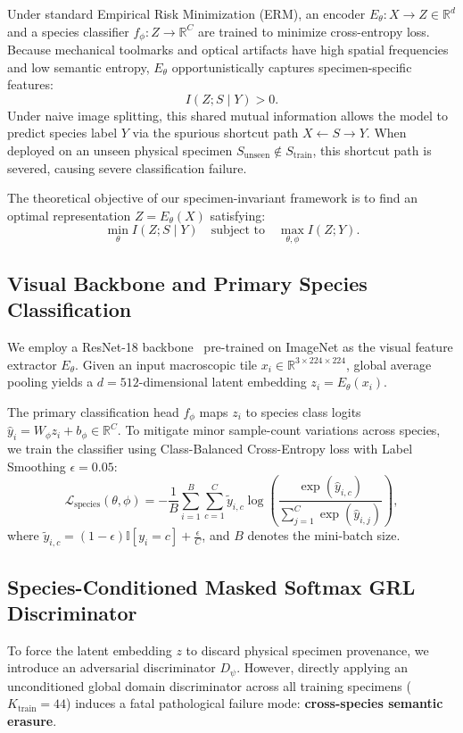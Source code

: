 \documentclass[a4paper,fleqn]{cas-sc}
\begin{document}
Under standard Empirical Risk Minimization (ERM), an encoder $E_\theta: X \to Z \in \mathbb{R}^d$ and a species classifier $f_\phi: Z \to \mathbb{R}^C$ are trained to minimize cross-entropy loss. Because mechanical toolmarks and optical artifacts have high spatial frequencies and low semantic entropy, $E_\theta$ opportunistically captures specimen-specific features:
\begin{equation}
    I(Z; S \mid Y) > 0.
\end{equation}
Under naive image splitting, this shared mutual information allows the model to predict species label $Y$ via the spurious shortcut path $X \leftarrow S \to Y$. When deployed on an unseen physical specimen $S_{\text{unseen}} \notin S_{\text{train}}$, this shortcut path is severed, causing severe classification failure. 

The theoretical objective of our specimen-invariant framework is to find an optimal representation $Z = E_\theta(X)$ satisfying:
\begin{equation}
    \min_\theta I(Z; S \mid Y) \quad \text{subject to} \quad \max_{\theta, \phi} I(Z; Y).
    \label{eq:objective}
\end{equation}

\subsection{Visual Backbone and Primary Species Classification}
We employ a ResNet-18 backbone~\cite{resnet} pre-trained on ImageNet as the visual feature extractor $E_\theta$. Given an input macroscopic tile $x_i \in \mathbb{R}^{3 \times 224 \times 224}$, global average pooling yields a $d=512$-dimensional latent embedding $z_i = E_\theta(x_i)$.

The primary classification head $f_\phi$ maps $z_i$ to species class logits $\hat{y}_i = W_\phi z_i + b_\phi \in \mathbb{R}^C$. To mitigate minor sample-count variations across species, we train the classifier using Class-Balanced Cross-Entropy loss with Label Smoothing $\epsilon = 0.05$:
\begin{equation}
    \mathcal{L}_{\text{species}}(\theta, \phi) = -\frac{1}{B} \sum_{i=1}^B \sum_{c=1}^C \tilde{y}_{i, c} \log \left(\frac{\exp(\hat{y}_{i, c})}{\sum_{j=1}^C \exp(\hat{y}_{i, j})}\right),
\end{equation}
where $\tilde{y}_{i, c} = (1 - \epsilon) \mathbb{I}[y_i = c] + \frac{\epsilon}{C}$, and $B$ denotes the mini-batch size.

\subsection{Species-Conditioned Masked Softmax GRL Discriminator}
To force the latent embedding $z$ to discard physical specimen provenance, we introduce an adversarial discriminator $D_\psi$. However, directly applying an unconditioned global domain discriminator across all training specimens ($K_{\text{train}} = 44$) induces a fatal pathological failure mode: \textbf{cross-species semantic erasure}. 
\end{document}
